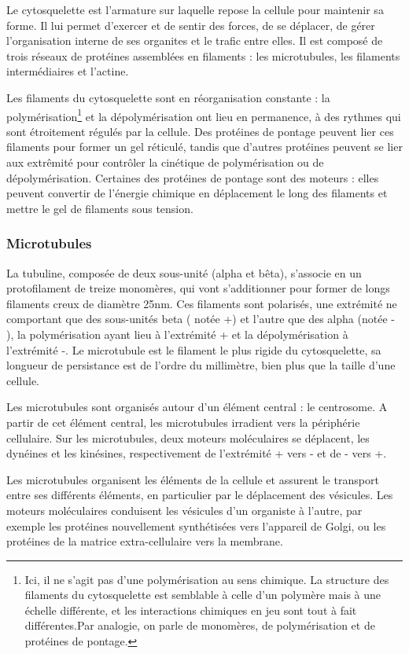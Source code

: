 \documentclass{report}
\begin{document}
Le cytosquelette est l'armature sur laquelle repose la cellule pour maintenir sa forme. Il lui permet d'exercer et de sentir des forces, de se déplacer, de gérer l'organisation interne de ses organites et le trafic entre elles. Il est composé de trois réseaux de protéines assemblées en filaments : les microtubules, les filaments intermédiaires et l'actine. 

Les filaments du cytosquelette sont en réorganisation constante : la polymérisation\footnote{Ici, il ne s'agit pas d'une polymérisation au sens chimique. La structure des filaments du cytosquelette est semblable à celle d'un polymère mais à une échelle différente, et les interactions chimiques en jeu sont tout à fait différentes.Par analogie, on parle de monomères, de polymérisation et de protéines de pontage.} et la dépolymérisation ont lieu en permanence, à des rythmes qui sont étroitement régulés par la cellule. 
Des protéines de pontage peuvent lier ces filaments pour former un gel réticulé, tandis que d'autres protéines peuvent se lier aux extrêmité pour contrôler la cinétique de polymérisation ou de dépolymérisation. Certaines des protéines de pontage sont des moteurs : elles peuvent convertir de l'énergie chimique en déplacement le long des filaments et mettre le gel de filaments sous tension. 

\subsubsection{Microtubules}

La tubuline, composée de deux sous-unité (alpha et bêta), s'associe en un protofilament de treize monomères, qui vont s'additionner pour former de longs filaments creux de diamètre 25nm. Ces filaments sont polarisés, une extrémité ne comportant que des sous-unités beta ( notée +) et l'autre que des alpha (notée - ), la polymérisation ayant lieu à l'extrémité + et la dépolymérisation à l'extrémité -. 
Le microtubule est le filament le plus rigide du cytosquelette, sa longueur de persistance est de l'ordre du millimètre, bien plus que la taille d'une cellule. 

Les microtubules sont organisés autour d'un élément central : le centrosome. A partir de cet élément central, les microtubules irradient vers la périphérie cellulaire. 
Sur les microtubules, deux moteurs moléculaires se déplacent, les dynéines et les kinésines, respectivement de l'extrémité + vers - et de - vers +.  

Les microtubules organisent les éléments de la cellule et assurent le transport entre ses différents éléments, en particulier par le déplacement des vésicules. Les moteurs moléculaires conduisent les vésicules d'un organiste à l'autre, par exemple les protéines nouvellement synthétisées vers l'appareil de Golgi, ou les protéines de la matrice extra-cellulaire vers la membrane. 
\end{document}
